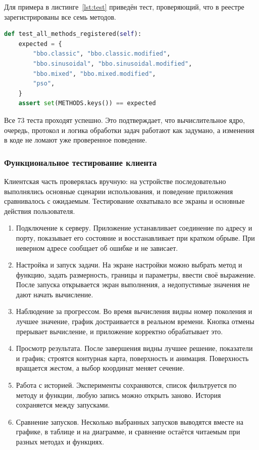 \documentclass[14pt, a4paper]{extarticle}
\begin{document}
 Для примера в листинге~\ref{lst:test} приведён тест, проверяющий, что в
реестре зарегистрированы все семь методов.

\begin{lstlisting}[language=Python, caption={Пример теста: проверка состава реестра методов}, label={lst:test}]
def test_all_methods_registered(self):
    expected = {
        "bbo.classic", "bbo.classic.modified",
        "bbo.sinusoidal", "bbo.sinusoidal.modified",
        "bbo.mixed", "bbo.mixed.modified",
        "pso",
    }
    assert set(METHODS.keys()) == expected
\end{lstlisting}

Все 73 теста проходят успешно. Это подтверждает, что вычислительное ядро, очередь,
протокол и логика обработки задач работают как задумано, а изменения в коде не
ломают уже проверенное поведение.

\subsubsection{Функциональное тестирование клиента}

Клиентская часть проверялась вручную: на устройстве последовательно выполнялись
основные сценарии использования, и поведение приложения сравнивалось с ожидаемым.
Тестирование охватывало все экраны и основные действия пользователя.

\begin{enumerate}
  \item Подключение к серверу. Приложение устанавливает соединение по адресу и
  порту, показывает его состояние и восстанавливает при кратком обрыве. При неверном
  адресе сообщает об ошибке и не зависает.

  \item Настройка и запуск задачи. На экране настройки можно выбрать метод и
  функцию, задать размерность, границы и параметры, ввести своё выражение. После
  запуска открывается экран выполнения, а недопустимые значения не дают начать
  вычисление.

  \item Наблюдение за прогрессом. Во время вычисления видны номер поколения и лучшее
  значение, график достраивается в реальном времени. Кнопка отмены прерывает
  вычисление, и приложение корректно обрабатывает это.

  \item Просмотр результата. После завершения видны лучшее решение, показатели и
  график; строятся контурная карта, поверхность и анимация. Поверхность вращается
  жестом, а выбор координат меняет сечение.

  \item Работа с историей. Эксперименты сохраняются, список фильтруется по методу и
  функции, любую запись можно открыть заново. История сохраняется между запусками.

  \item Сравнение запусков. Несколько выбранных запусков выводятся вместе на
  графике, в таблице и на диаграмме, и сравнение остаётся читаемым при разных
  методах и функциях.
\end{enumerate}
\end{document}
